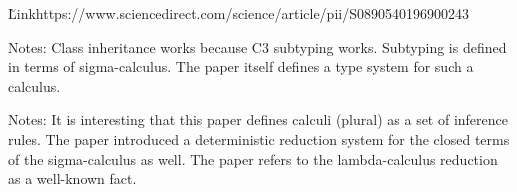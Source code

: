 \u{Link}{https://www.sciencedirect.com/science/article/pii/S0890540196900243}

Notes:
\ls Class inheritance works because C3 subtyping works.
\li Subtyping is defined in terms of sigma-calculus.
\li The paper itself defines a type system for such a calculus.
\le

Notes:
It is interesting that this paper defines calculi (plural) as a set of inference
rules. The paper introduced a deterministic reduction system for the closed
terms of the sigma-calculus as well. The paper refers to the lambda-calculus
reduction as a well-known fact.
